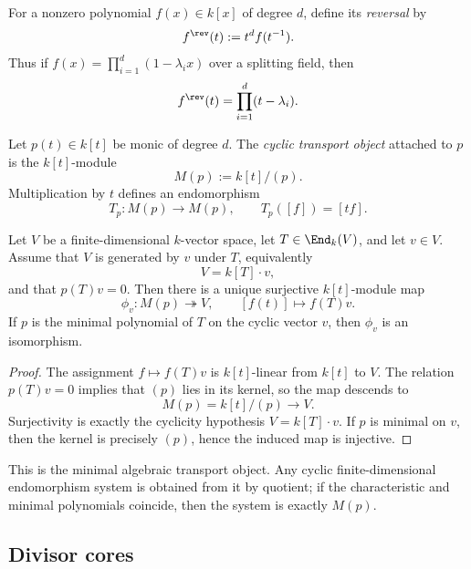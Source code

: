 \begin{definition}
For a nonzero polynomial \(f(x)\in k[x]\) of degree \(d\), define its \emph{reversal}
by
\[
f^{\rev}(t):=t^d f(t^{-1}).
\]
Thus if \(f(x)=\prod_{i=1}^d (1-\lambda_i x)\) over a splitting field,
then
\[
f^{\rev}(t)=\prod_{i=1}^d (t-\lambda_i).
\]
\end{definition}

\begin{definition}
Let \(p(t)\in k[t]\) be monic of degree \(d\).
The \emph{cyclic transport object} attached to \(p\) is the \(k[t]\)-module
\[
M(p):=k[t]/(p).
\]
Multiplication by \(t\) defines an endomorphism
\[
T_p \colon M(p)\to M(p),\qquad T_p([f])=[tf].
\]
\end{definition}

\begin{proposition}
Let \(V\) be a finite-dimensional \(k\)-vector space, let \(T\in \End_k(V)\), and let \(v\in V\).
Assume that \(V\) is generated by \(v\) under \(T\), equivalently
\[
V = k[T]\cdot v,
\]
and that \(p(T)v=0\).
Then there is a unique surjective \(k[t]\)-module map
\[
\phi_v \colon M(p)\twoheadrightarrow V,\qquad [f(t)]\mapsto f(T)v.
\]
If \(p\) is the minimal polynomial of \(T\) on the cyclic vector \(v\), then \(\phi_v\) is an isomorphism.
\end{proposition}

\begin{proof}
The assignment \(f\mapsto f(T)v\) is \(k[t]\)-linear from \(k[t]\) to \(V\).
The relation \(p(T)v=0\) implies that \((p)\) lies in its kernel, so the map descends to
\[
M(p)=k[t]/(p)\to V.
\]
Surjectivity is exactly the cyclicity hypothesis \(V=k[T]\cdot v\).
If \(p\) is minimal on \(v\), then the kernel is precisely \((p)\), hence the induced map is injective.
\end{proof}

\begin{remark}
This is the minimal algebraic transport object.
Any cyclic finite-dimensional endomorphism system is obtained from it by quotient;
if the characteristic and minimal polynomials coincide, then the system is exactly \(M(p)\).
\end{remark}

\subsection{Divisor cores}

